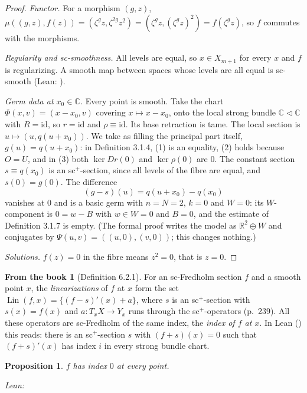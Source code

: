\documentclass[11pt,a4paper]{article}
\newcommand{\leanref}[1]{\par\nopagebreak
  {\raggedleft\small\upshape\color{leangrey}Lean:~#1\par}}
\theoremstyle{plain}
\newtheorem{proposition}[theorem]{Proposition}
\theoremstyle{definition}
\newtheorem{recall}[theorem]{From the book}
\theoremstyle{remark}
\newcommand{\C}{\mathbb{C}}
\newcommand{\R}{\mathbb{R}}
\newcommand{\Lin}{\operatorname{Lin}}
\newcommand{\id}{\mathrm{id}}
\begin{document}
\begin{proof}
\emph{Functor.} For a morphism $(g,z)$,
$\mu((g,z),f(z))=(\zeta^g z,\zeta^{2g}z^2)=(\zeta^g z,(\zeta^g z)^2)=f(\zeta^g z)$, so $f$ commutes
with the morphisms.

\emph{Regularity and sc-smoothness.} All levels are equal, so $x\in X_{m+1}$ for every $x$ and $f$ is
regularizing. A smooth map between spaces whose levels are all equal is sc-smooth (Lean:
).

\emph{Germ data at $x_0\in\C$.} Every point is smooth. Take the chart $\Phi(x,v)=(x-x_0,v)$ covering
$x\mapsto x-x_0$, onto the local strong bundle $\C\triangleleft\C$ with $R=\id$, so $r=\id$ and
$\rho\equiv\id$. Its base retraction is tame. The local section is $u\mapsto(u,q(u+x_0))$. We take as
filling the principal part itself, $g(u)=q(u+x_0)$: in Definition 3.1.4, (1) is an equality, (2) holds
because $O=U$, and in (3) both $\ker Dr(0)$ and $\ker\rho(0)$ are $0$. The constant section
$s\equiv q(x_0)$ is an sc$^+$-section, since all levels of the fibre are equal, and $s(0)=g(0)$. The
difference
\[
  (g-s)(u)=q(u+x_0)-q(x_0)
\]
vanishes at $0$ and is a basic germ with $n=N=2$, $k=0$ and $W=0$: its $W$-component is $0=w-B$ with
$w\in W=0$ and $B=0$, and the estimate of Definition 3.1.7 is empty. (The formal proof writes the model
as $\R^2\oplus W$ and conjugates by $\Psi(u,v)=((u,0),(v,0))$; this changes nothing.)

\emph{Solutions.} $f(z)=0$ in the fibre means $z^2=0$, that is $z=0$.
\end{proof}

\begin{recall}[Definition 6.2.1]\label{rec:index}
For an sc-Fredholm section $f$ and a smooth point $x$, the \emph{linearizations} of $f$ at $x$ form the
set $\Lin(f,x)=\{(f-s)'(x)+a\}$, where $s$ is an sc$^+$-section with $s(x)=f(x)$ and $a\colon
T_xX\to Y_x$ runs through the sc$^+$-operators (p.~239). All these operators are sc-Fredholm of the
same index, the \emph{index of $f$ at $x$}. In Lean () this reads:
there is an sc$^+$-section $s$ with $(f+s)(x)=0$ such that $(f+s)'(x)$ has index $i$ in every strong
bundle chart.
\end{recall}

\begin{proposition}\label{prop:index}
$f$ has index $0$ at every point.
\leanref{}
\end{proposition}
\end{document}
